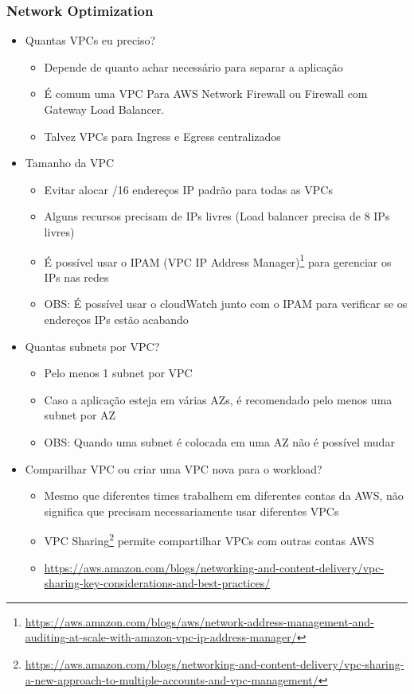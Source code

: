 \begin{frame}
	\frametitle{Network Optimization}
	\begin{itemize}
		\item Quantas VPCs eu preciso?
			\begin{itemize}
				\item Depende de quanto achar necessário para separar a aplicação
				\item É comum uma VPC Para AWS Network Firewall ou Firewall com Gateway Load Balancer.
				\item Talvez VPCs para Ingress e Egress centralizados
			\end{itemize}
		\item Tamanho da VPC
			\begin{itemize}
				\item Evitar alocar /16 endereços IP padrão para todas as VPCs
				\item Alguns recursos precisam de IPs livres (Load balancer precisa de 8 IPs livres)
				\item É possível usar o IPAM (VPC IP Address Manager)\footnote{\href{Network Address Management and Auditing at Scale with Amazon VPC IP Address Manager}{https://aws.amazon.com/blogs/aws/network-address-management-and-auditing-at-scale-with-amazon-vpc-ip-address-manager/}} para gerenciar os IPs nas redes
				\item OBS: É possível usar o cloudWatch junto com o IPAM para verificar se os endereços IPs estão acabando
			\end{itemize}
		\item Quantas subnets por VPC?
			\begin{itemize}
				\item Pelo menos 1 subnet por VPC
				\item Caso a aplicação esteja em várias AZs, é recomendado pelo menos uma subnet por AZ
				\item OBS: Quando uma subnet é colocada em uma AZ não é possível mudar
			\end{itemize}
		\item Comparilhar VPC ou criar uma VPC nova para o workload?
			\begin{itemize}
				\item Mesmo que diferentes times trabalhem em diferentes contas da AWS, não significa que precisam necessariamente usar diferentes VPCs
				\item VPC Sharing\footnote{\href{VPC Sharing}{https://aws.amazon.com/blogs/networking-and-content-delivery/vpc-sharing-a-new-approach-to-multiple-accounts-and-vpc-management/}} permite compartilhar VPCs com outras contas AWS
				\item \href{VPC Sharing Best Pratices}{https://aws.amazon.com/blogs/networking-and-content-delivery/vpc-sharing-key-considerations-and-best-practices/}
			\end{itemize}
	\end{itemize}
\end{frame}

